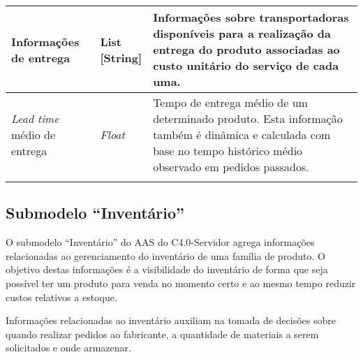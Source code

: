 \begin{longtable}{p{} p{} p{}}
	\hline
	Informações de entrega
	 & \makecell{List\\{[String]}}
	 & Informações sobre transportadoras disponíveis para a realização da entrega do produto associadas ao custo unitário do serviço de cada uma.                                                                                                                                                                                                                                                                                                                                                                                                                                                                                                               \\

	\hline
	\textit{Lead time} médio de entrega
	 & \textit{Float}
	 & Tempo de entrega médio de um determinado produto. Esta informação também é dinâmica e calculada com base no tempo histórico médio observado em pedidos passados.                                                                                                                                                                                                                                                                                                                                                                                                                                                                                               \\



	\hline
	\label{tab:submodelo-processos}
\end{longtable}

\subsection{Submodelo ``Inventário''}

O submodelo ``Inventário'' do AAS do C4.0-Servidor agrega informações relacionadas ao gerenciamento do inventário de uma família de produto. O objetivo destas informações é a visibilidade do inventário de forma que seja possível ter um produto para venda no momento certo e ao mesmo tempo reduzir custos relativos a estoque.

Informações relacionadas ao inventário auxiliam na tomada de decisões sobre quando realizar pedidos ao fabricante, a quantidade de materiais a serem solicitados e onde armazenar.

